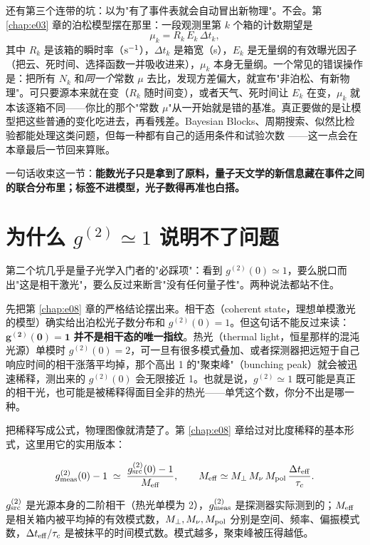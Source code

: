 还有第三个连带的坑：以为"有了事件表就会自动冒出新物理"。不会。第 \ref{chap:e03} 章的泊松模型摆在那里：一段观测里第 \(k\) 个箱的计数期望是
\[
  \mu_k=R_k\,E_k\,\Delta t_k,
\]
其中 \(R_k\) 是该箱的瞬时率（\({\rm s}^{-1}\)），\(\Delta t_k\) 是箱宽（s），\(E_k\) 是无量纲的有效曝光因子（把云、死时间、选择函数一并吸收进来），\(\mu_k\) 本身无量纲。一个常见的错误操作是：把所有 \(N_k\) 和\emph{同一个}常数 \(\mu\) 去比，发现方差偏大，就宣布"非泊松、有新物理"。可只要源本来就在变（\(R_k\) 随时间变），或者天气、死时间让 \(E_k\) 在变，\(\mu_k\) 就本该逐箱不同——你比的那个"常数 \(\mu\)"从一开始就是错的基准。真正要做的是让模型把这些普通的变化吃进去，再看残差。Bayesian Blocks、周期搜索、似然比检验都能处理这类问题，但每一种都有自己的适用条件和试验次数 \citep{2013ApJ...764..167S,1982ApJ...263..835S,1992ApJ...398..146G,2002ApJ...571..545P}——这一点会在本章最后一节回来算账。

一句话收束这一节：\textbf{能数光子只是拿到了原料，量子天文学的新信息藏在事件之间的联合分布里；标签不进模型，光子数得再准也白搭。}


\section{\texorpdfstring{为什么 \(g^{(2)}\simeq1\) 说明不了问题}{为什么 g2 约等于 1 说明不了问题}}
\label{sec:e27-g2}

第二个坑几乎是量子光学入门者的"必踩项"：看到 \(g^{(2)}(0)\simeq1\)，要么脱口而出"这是相干激光"，要么反过来断言"没有任何量子性"。两种说法都站不住。

先把第 \ref{chap:e08} 章的严格结论摆出来。相干态（coherent state，理想单模激光的模型）确实给出泊松光子数分布和 \(g^{(2)}(0)=1\)。但这句话不能反过来读：\(\mathbf{g^{(2)}(0)=1}\) \textbf{并不是相干态的唯一指纹}。热光（thermal light，恒星那样的混沌光源）单模时 \(g^{(2)}(0)=2\)，可一旦有很多模式叠加、或者探测器把远短于自己响应时间的相干涨落平均掉，那个高出 1 的"聚束峰"（bunching peak）就会被迅速稀释，测出来的 \(g^{(2)}(0)\) 会无限接近 1。也就是说，\(g^{(2)}\simeq1\) 既可能是真正的相干光，也可能是被稀释得面目全非的热光——单凭这个数，你分不出是哪一种。

把稀释写成公式，物理图像就清楚了。第 \ref{chap:e08} 章给过对比度稀释的基本形式，这里用它的实用版本：

\begin{equation}
  g^{(2)}_{\rm meas}(0)-1
  \;\simeq\;
  \frac{g^{(2)}_{\rm src}(0)-1}{M_{\rm eff}},
  \qquad
  M_{\rm eff}\simeq M_\perp\,M_\nu\,M_{\rm pol}\,\frac{\Delta t_{\rm eff}}{\tau_c}.
  \label{eq:e27-dilution}
\end{equation}
\begin{formulaexplain}
\(g^{(2)}_{\rm src}\) 是光源本身的二阶相干（热光单模为 2），\(g^{(2)}_{\rm meas}\) 是探测器实际测到的；\(M_{\rm eff}\) 是相关箱内被平均掉的有效模式数，\(M_\perp,M_\nu,M_{\rm pol}\) 分别是空间、频率、偏振模式数，\(\Delta t_{\rm eff}/\tau_c\) 是被抹平的时间模式数。模式越多，聚束峰被压得越低。
\end{formulaexplain}

